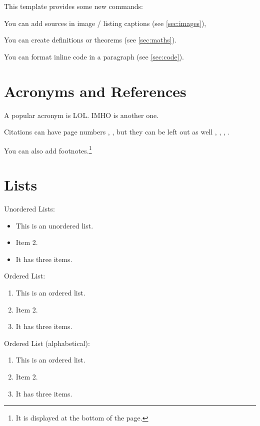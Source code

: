 This template provides some new commands:

You can add sources in image / listing captions (see \autoref{sec:images}), 

You can create definitions or theorems (see \autoref{sec:maths}).

You can format inline code in a paragraph (see \autoref{sec:code}).

\section{Acronyms and References}

A popular acronym is \acs{LOL}. \acf{IMHO} is another one. 
	
Citations can have page numbers \cite[p. 473]{smi:60}, \cite[pp. 359 - 360]{doe:16}, but they can be left out as well \cite{wai:99}, \cite{mus:16}, \cite{wri:81}, \cite{stu:89}.

You can also add footnotes.\footnote{It is displayed at the bottom of the page.}

\pagebreak

\section{Lists}

Unordered Lists:
\begin{itemize}
\item This is an unordered list. 
\item Item 2.
\item It has three items.
\end{itemize}

Ordered List:
\begin{enumerate}
\item This is an ordered list.
\item Item 2.
\item It has three items.
\end{enumerate}

Ordered List (alphabetical):
\begin{enumerate}[label=\Alph*.]
\item This is an ordered list.
\item Item 2.
\item It has three items.
\end{enumerate}

\cleardoublepage
